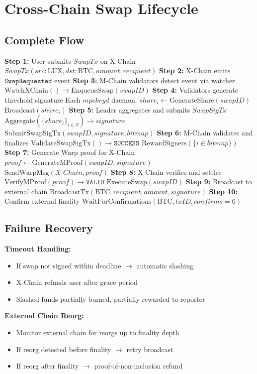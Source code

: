 \section{Cross-Chain Swap Lifecycle}


\subsection{Complete Flow}



\begin{algorithmic}[1]
\State \textbf{Step 1:} User submits $SwapTx$ on X-Chain
\State \quad $SwapTx(src: \text{LUX}, dst: \text{BTC}, amount, recipient)$
\State
\State \textbf{Step 2:} X-Chain emits $\texttt{SwapRequested}$ event
\State
\State \textbf{Step 3:} M-Chain validators detect event via watcher
\State \quad $\text{WatchXChain}() \rightarrow \text{EnqueueSwap}(swapID)$
\State
\State \textbf{Step 4:} Validators generate threshold signature
\State \quad Each $mpckeyd$ daemon:
\State \quad \quad $share_i \gets \text{GenerateShare}(swapID)$
\State \quad \quad $\text{Broadcast}(share_i)$
\State
\State \textbf{Step 5:} Leader aggregates and submits $SwapSigTx$
\State \quad $\text{Aggregate}(\{share_i\}_{i \in S}) \rightarrow signature$
\State \quad $\text{SubmitSwapSigTx}(swapID, signature, bitmap)$
\State
\State \textbf{Step 6:} M-Chain validates and finalizes
\State \quad $\text{ValidateSwapSigTx}() \rightarrow \texttt{SUCCESS}$
\State \quad $\text{RewardSigners}(\{i \in bitmap\})$
\State
\State \textbf{Step 7:} Generate Warp proof for X-Chain
\State \quad $proof \gets \text{GenerateMProof}(swapID, signature)$
\State \quad $\text{SendWarpMsg}(X\text{-}Chain, proof)$
\State
\State \textbf{Step 8:} X-Chain verifies and settles
\State \quad $\text{VerifyMProof}(proof) \rightarrow \texttt{VALID}$
\State \quad $\text{ExecuteSwap}(swapID)$ 
\State
\State \textbf{Step 9:} Broadcast to external chain
\State \quad $\text{BroadcastTx}(\text{BTC}, recipient, amount, signature)$
\State
\State \textbf{Step 10:} Confirm external finality
\State \quad $\text{WaitForConfirmations}(\text{BTC}, txID, confirms = 6)$
\end{algorithmic}


\subsection{Failure Recovery}

\textbf{Timeout Handling:}
\begin{itemize}
\item If swap not signed within deadline $\to$ automatic slashing
\item X-Chain refunds user after grace period
\item Slashed funds partially burned, partially rewarded to reporter
\end{itemize}

\textbf{External Chain Reorg:}
\begin{itemize}
\item Monitor external chain for reorgs up to finality depth
\item If reorg detected before finality $\to$ retry broadcast
\item If reorg after finality $\to$ proof-of-non-inclusion refund
\end{itemize}


